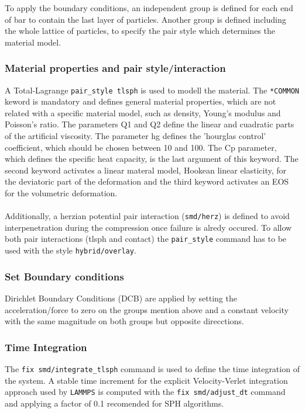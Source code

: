 \documentclass[11pt]{scrartcl}
\begin{document}
To apply the boundary conditions, an independent group is defined for each end of bar to contain the
last layer of particles. Another group is defined including the whole lattice of particles, to specify
the pair style which determines the material model.

\subsubsection{Material properties and pair style/interaction}
A Total-Lagrange \texttt{pair\_style tlsph} is used to modell the material. The \texttt{*COMMON}
keword is mandatory and defines general material properties, which are not related with a specific
material model, such as density, Young's modulus and Poisson's ratio. The parameters Q1 and Q2 define
the linear and cuadratic parts of the artificial viscosity. The parameter hg defines the 'hourglas
control' coefficient, which should be chosen between 10 and 100. The Cp parameter, which defines the
specific heat capacity, is the last argument of this keyword. The second keyword activates a linear
materal model, Hookean linear elasticity, for the deviatoric part of the deformation and the third
keyword activates an EOS for the volumetric deformation.
\\\\
Additionally, a herzian potential pair interaction (\texttt{smd/herz}) is defined to avoid
interpenetration during the compression once failure is alredy occured. To allow both pair
interactions (tlsph and contact) the \texttt{pair\_style} command has to be used with the style
\texttt{hybrid/overlay}.

\subsubsection{Set Boundary conditions}
Dirichlet Boundary Conditions (DCB) are applied by setting the acceleration/force to zero on the groups
mention above and a constant velocity with the same magnitude on both groups but opposite direcctions.

\subsubsection{Time Integration}
The \texttt{fix smd/integrate\_tlsph} command is used to define the time integration of the system.
A stable time increment for the explicit Velocity-Verlet integration approach used by \texttt{LAMMPS}
is computed with the \texttt{fix smd/adjust\_dt} command and applying a factor of 0.1 recomended for
SPH algorithms.
\end{document}
